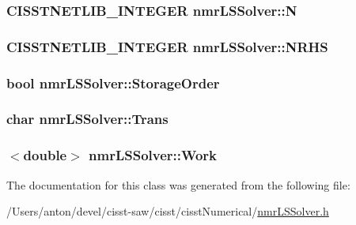 \subsubsection[{N}]{\setlength{\rightskip}{0pt plus 5cm}C\+I\+S\+S\+T\+N\+E\+T\+L\+I\+B\+\_\+\+I\+N\+T\+E\+G\+E\+R nmr\+L\+S\+Solver\+::\+N\hspace{0.3cm}{\ttfamily [protected]}}\label{classnmr_l_s_solver_a06ea8b9ad9abd90f794cdeb74c25b8f8}
\hypertarget{classnmr_l_s_solver_a01d9ecf148cd5d9e59906b5e665af2ca}{}
\subsubsection[{N\+R\+H\+S}]{\setlength{\rightskip}{0pt plus 5cm}C\+I\+S\+S\+T\+N\+E\+T\+L\+I\+B\+\_\+\+I\+N\+T\+E\+G\+E\+R nmr\+L\+S\+Solver\+::\+N\+R\+H\+S\hspace{0.3cm}{\ttfamily [protected]}}\label{classnmr_l_s_solver_a01d9ecf148cd5d9e59906b5e665af2ca}
\hypertarget{classnmr_l_s_solver_a86082a8fc8b55dee2d677af9222fc7e6}{}
\subsubsection[{Storage\+Order}]{\setlength{\rightskip}{0pt plus 5cm}bool nmr\+L\+S\+Solver\+::\+Storage\+Order\hspace{0.3cm}{\ttfamily [protected]}}\label{classnmr_l_s_solver_a86082a8fc8b55dee2d677af9222fc7e6}
\hypertarget{classnmr_l_s_solver_a55e24be3fab77ab196c264948a7e6616}{}
\subsubsection[{Trans}]{\setlength{\rightskip}{0pt plus 5cm}char nmr\+L\+S\+Solver\+::\+Trans\hspace{0.3cm}{\ttfamily [protected]}}\label{classnmr_l_s_solver_a55e24be3fab77ab196c264948a7e6616}
\hypertarget{classnmr_l_s_solver_a4b87766126014f24e3a2dbc2c3ab3d31}{}
\subsubsection[{Work}]{$<$double$>$ nmr\+L\+S\+Solver\+::\+Work\hspace{0.3cm}{\ttfamily [protected]}}\label{classnmr_l_s_solver_a4b87766126014f24e3a2dbc2c3ab3d31}


The documentation for this class was generated from the following file\+:\begin{DoxyCompactItemize}
\item 
/\+Users/anton/devel/cisst-\/saw/cisst/cisst\+Numerical/\hyperlink{nmr_l_s_solver_8h}{nmr\+L\+S\+Solver.\+h}\end{DoxyCompactItemize}
